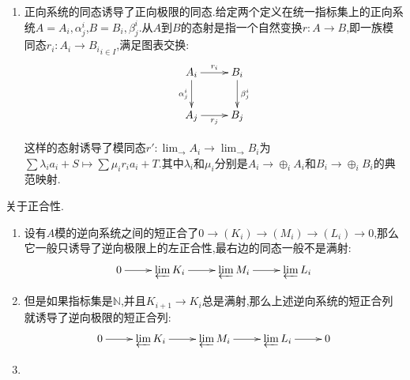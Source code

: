 \begin{enumerate}
\begin{enumerate}
\begin{proof}
			于是当$l\not=t$时$\lambda_lx_l=0$,于是$x_l=0$,于是这个式子变成$\lambda_t\varphi_t^im_i=0$,于是$\varphi_t^i(m_i)=0$.
		\end{proof}
		\item 给定有向集上的正向系统$\{M_i,\varphi_j^i\}$,取全体$M_i$的无交并为集合$M$.现在定义$M$上的一个等价关系为,对$m_i\in M_i$和$m_j\in M_j$,它们等价当且仅当存在公共前继元,即存在某个$k\in I$满足$k\ge i$和$k\ge j$,且有$\varphi_k^i(m_i)=\varphi_k^j(m_j)$.自反性和对称性是直接的,现在说明传递性.假设$m_i\sim m_j$,即存在$p\ge i,j$使得$\varphi_p^i(m_i)=\varphi_p^j(m_j)$.又设$m_j\sim m_k$,即存在$q\ge j,k$使得$\varphi_q^j(m_j)=\varphi_q^k(m_k)$.由于$I$是有向集,可取$r\ge p,q$,于是图表交换性说明$\varphi_r^i(m_i)=\varphi_r^p\circ\varphi_p^i(m_i)=\varphi_r^p\circ\varphi_p^j(m_j)=\varphi_r^j(m_j)=\varphi_r^q\circ\varphi_q^j(m_j)=\varphi_r^q\circ\varphi_q^k(m_k)=\varphi_r^k(m_k)$.
		\item 现在取全体等价类构成的集合为$L$,我们断言$L$具有左$R$模结构.把$m_i\in M$所在的等价类记作$[m_i]$.定义交换群结构为$[m_i]+[m_j]=[\varphi_k^i(m_i)+\varphi_k^j(m_j)]$,其中$k\ge i,j$由有向集条件保证.定义模结构为$r[m_i]=[rm_i]$.这使得$L$成为一个$R$模.
		\item 最后验证$L$同构于我们之前构造的正向极限$D$.构造$f:L\to D$为$[m_i]\mapsto m_i+S$,按照$S$的构造知$f$定义良性,验证$f$是模同态.我们说明过$I$是有向集的时候$D$中每个元可以表示为$\alpha_i(m_i)$,这导致$f$是满同态.我们还证明过$0=f([m_i])=m_i+S$导致存在某个$j\ge i$使得$\varphi_j^i(m_i)=0$,这说明$m_i\sim0$,即$[m_i]=[0]$,于是$f$是单射,这就证明了$f$是同构.
	\end{enumerate}
	\item 正向系统的同态诱导了正向极限的同态.给定两个定义在统一指标集上的正向系统$A={A_i,\alpha_j^i}$,$B={B_i,\beta_j^i}$.从$A$到$B$的态射是指一个自然变换$r:A\to B$,即一族模同态${r_i:A_i\to B_i}_{i\in I}$,满足图表交换:
	$$\xymatrix{A_i\ar[r]^{r_i}\ar[d]_{\alpha_j^i}&B_i\ar[d]^{\beta_j^i}\\
		A_j\ar[r]_{r_j}&B_j}$$
	
	这样的态射诱导了模同态$r':\lim_{\rightarrow}A_i\to\lim_{\rightarrow}B_i$为$\sum\lambda_ia_i+S\mapsto\sum\mu_ir_ia_i+T$.其中$\lambda_i$和$\mu_i$分别是$A_i\to\oplus_iA_i$和$B_i\to\oplus_iB_i$的典范映射.
\end{enumerate}

关于正合性.
\begin{enumerate}
	\item 设有$A$模的逆向系统之间的短正合了$0\to(K_i)\to(M_i)\to(L_i)\to0$,那么它一般只诱导了逆向极限上的左正合性,最右边的同态一般不是满射:
	$$\xymatrix{0\ar[r]&\varprojlim K_i\ar[r]&\varprojlim M_i\ar[r]&\varprojlim L_i}$$
	\item 但是如果指标集是$\mathbb{N}$,并且$K_{i+1}\to K_i$总是满射,那么上述逆向系统的短正合列就诱导了逆向极限的短正合列:
	$$\xymatrix{0\ar[r]&\varprojlim K_i\ar[r]&\varprojlim M_i\ar[r]&\varprojlim L_i\ar[r]&0}$$
	\item 
\end{enumerate}



